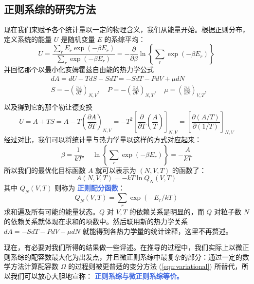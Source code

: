 \subsection{正则系综的研究方法}
现在我们来赋予各个统计量以一定的物理含义，我们从能量开始。根据正则分布，定义系统的能量 $U$ 是随机变量 $E$ 的系综平均：
\begin{equation}
    U=\frac{\sum_r E_r \exp \left(-\beta E_r\right)}{\sum_r \exp \left(-\beta E_r\right)}=-\frac{\partial}{\partial \beta} \ln \left\{\sum_r \exp \left(-\beta E_r\right)\right\}
\end{equation}
并回忆那个以最小化亥姆霍兹自由能的热力学公式
\[
    \begin{aligned}
& d A=d U-T d S-S d T=-S d T-P d V+\mu d N \\
& S=-\left(\frac{\partial A}{\partial T}\right)_{N, V}, \quad P=-\left(\frac{\partial A}{\partial V}\right)_{N, T}, \quad \mu=\left(\frac{\partial A}{\partial N}\right)_{V, T}, \\
&
\end{aligned}
\]
以及得到它的那个勒让德变换
\[
    U=A+T S=A-T\left(\frac{\partial A}{\partial T}\right)_{N, V}=-T^2\left[\frac{\partial}{\partial T}\left(\frac{A}{T}\right)\right]_{N, V}=\left[\frac{\partial(A / T)}{\partial(1 / T)}\right]_{N, V}
\]
经过对比，我们可以将统计量与热力学量以这样的方式对应起来：
\begin{equation}
    \beta=\frac{1}{k T}, \quad \ln \left\{\sum_r \exp \left(-\beta E_r\right)\right\}=-\frac{A}{k T}
\end{equation}
所以我们的最优化目标函数 $A$ 就可以表示为 $(N,V,T)$ 的函数了：
\begin{equation}
        A(N, V, T)=-k T \ln Q_N(V, T)
\end{equation}
其中 $Q_N(V,T)$ 则称为 \textcolor{RoyalBlue}{\textbf{\kaishu 正则配分函数}}：
\begin{equation}
    Q_N(V, T)=\sum_r \exp \left(-E_r / k T\right)
\end{equation}
求和遍及所有可能的能量状态。$Q$ 对 $V,T$ 的依赖关系是明显的，而 $Q$ 对粒子数 $N$ 的依赖关系就体现在求和的项数中。然后联用新的热力学关系 $d A= -S d T-P d V+\mu d N $ 就能得到各热力学量的统计诠释，这里不再赘述。

现在，有必要对我们所得的结果做一些评述。在推导的过程中，我们实际上以微正则系综的配容数最大化为出发点，并且微正则系综中最复杂的部分：通过一定的数学方法计算配容数 $\Omega$ 的过程则被更普适的变分方法 (\ref*{equ:variational}) 所替代，所以我们可以放心大胆地宣称： \textcolor{RoyalBlue}{\textbf{\kaishu  正则系综与微正则系综等价。}}


